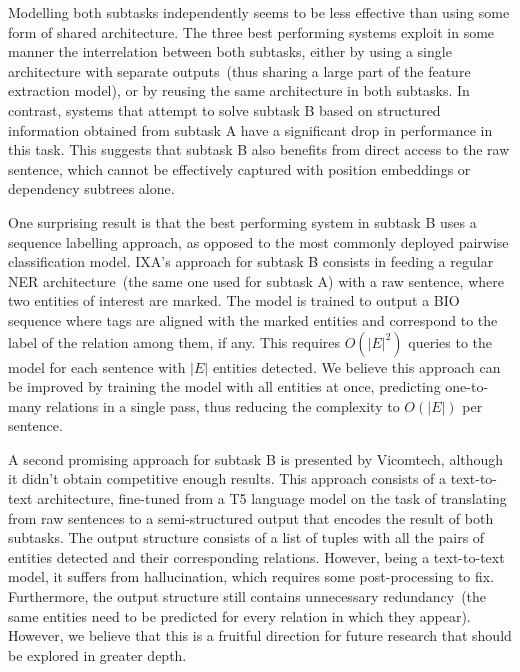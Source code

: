 \documentclass[a4paper,11pt,twocolumn,twoside]{article}
\begin{document}
Modelling both subtasks independently seems to be less effective than using some form of shared architecture.
The three best performing systems exploit in some manner the interrelation between both subtasks, either by using a single architecture with separate outputs~(thus sharing a large part of the feature extraction model), or by reusing the same architecture in both subtasks.
In contrast, systems that attempt to solve subtask B based on structured information obtained from subtask A have a significant drop in performance in this task.
This suggests that subtask B also benefits from direct access to the raw sentence, which cannot be effectively captured with position embeddings or dependency subtrees alone.

One surprising result is that the best performing system in subtask B uses a sequence labelling approach, as opposed to the most commonly deployed pairwise classification model.
IXA's approach for subtask B consists in feeding a regular NER architecture~(the same one used for subtask A) with a raw sentence, where two entities of interest are marked.
The model is trained to output a BIO sequence where tags are aligned with the marked entities and correspond to the label of the relation among them, if any.
This requires $O(|E|^2)$ queries to the model for each sentence with $|E|$ entities detected.
We believe this approach can be improved by training the model with all entities at once, predicting one-to-many relations in a single pass, thus reducing the complexity to $O(|E|)$ per sentence.

A second promising approach for subtask B is presented by Vicomtech, although it didn't obtain competitive enough results.
This approach consists of a text-to-text architecture, fine-tuned from a T5 language model on the task of translating from raw sentences to a semi-structured output that encodes the result of both subtasks.
The output structure consists of a list of tuples with all the pairs of entities detected and their corresponding relations.
However, being a text-to-text model, it suffers from hallucination, which requires some post-processing to fix.
Furthermore, the output structure still contains unnecessary redundancy~(the same entities need to be predicted for every relation in which they appear).
However, we believe that this is a fruitful direction for future research that should be explored in greater depth.
\end{document}
